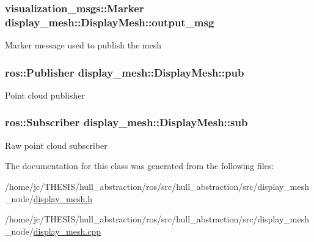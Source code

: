 \subsubsection[{\texorpdfstring{output\+\_\+msg}{output_msg}}]{\setlength{\rightskip}{0pt plus 5cm}visualization\+\_\+msgs\+::\+Marker display\+\_\+mesh\+::\+Display\+Mesh\+::output\+\_\+msg\hspace{0.3cm}{\ttfamily [private]}}\hypertarget{classdisplay__mesh_1_1_display_mesh_a950554fa9242f3d358e1085955e37a5b}{}\label{classdisplay__mesh_1_1_display_mesh_a950554fa9242f3d358e1085955e37a5b}
Marker message used to publish the mesh 
\subsubsection[{\texorpdfstring{pub}{pub}}]{\setlength{\rightskip}{0pt plus 5cm}ros\+::\+Publisher display\+\_\+mesh\+::\+Display\+Mesh\+::pub\hspace{0.3cm}{\ttfamily [private]}}\hypertarget{classdisplay__mesh_1_1_display_mesh_ad2ede578fe0dae783e9e06942441e2be}{}\label{classdisplay__mesh_1_1_display_mesh_ad2ede578fe0dae783e9e06942441e2be}
Point cloud publisher 
\subsubsection[{\texorpdfstring{sub}{sub}}]{\setlength{\rightskip}{0pt plus 5cm}ros\+::\+Subscriber display\+\_\+mesh\+::\+Display\+Mesh\+::sub\hspace{0.3cm}{\ttfamily [private]}}\hypertarget{classdisplay__mesh_1_1_display_mesh_a0cef4c6f1b95ba3ad39a470e277bbe7e}{}\label{classdisplay__mesh_1_1_display_mesh_a0cef4c6f1b95ba3ad39a470e277bbe7e}
Raw point cloud subscriber 

The documentation for this class was generated from the following files\+:\begin{DoxyCompactItemize}
\item 
/home/jc/\+T\+H\+E\+S\+I\+S/hull\+\_\+abstraction/ros/src/hull\+\_\+abstraction/src/display\+\_\+mesh\+\_\+node/\hyperlink{display__mesh_8h}{display\+\_\+mesh.\+h}\item 
/home/jc/\+T\+H\+E\+S\+I\+S/hull\+\_\+abstraction/ros/src/hull\+\_\+abstraction/src/display\+\_\+mesh\+\_\+node/\hyperlink{display__mesh_8cpp}{display\+\_\+mesh.\+cpp}\end{DoxyCompactItemize}
